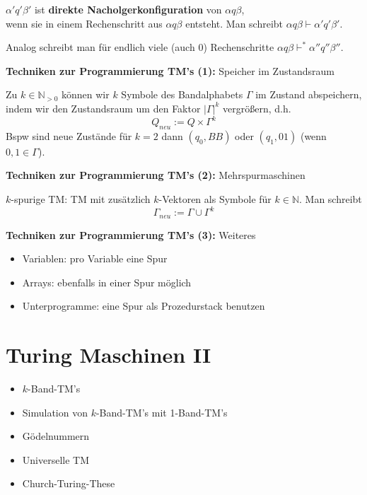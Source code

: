 \documentclass[a4paper,graphics,11pt]{article}
\begin{document}
$\alpha'q'\beta'$ ist \textbf{direkte Nacholgerkonfiguration} von $\alpha q \beta$,\\
wenn sie in einem Rechenschritt aus $\alpha q \beta$ entsteht. Man schreibt $\alpha q\beta \vdash \alpha'q'\beta'$.

Analog schreibt man für endlich viele (auch 0) Rechenschritte $\alpha q \beta \vdash^* \alpha''q''\beta''$.

\strut

\textbf{Techniken zur Programmierung TM's (1):} Speicher im Zustandsraum

Zu $k \in \mathbb{N}_{>0}$ können wir $k$ Symbole des Bandalphabets $\Gamma$ im Zustand abspeichern,\\
indem wir den Zustandsraum um den Faktor $|\Gamma|^k$ vergrößern, d.h.
$$
    Q_{neu} := Q \times \Gamma^k
$$
Bspw sind neue Zustände für $k = 2$ dann $(q_0, BB)$ oder $(q_1, 01)$ (wenn $0,1 \in \Gamma$).

\strut

\textbf{Techniken zur Programmierung TM's (2):} Mehrspurmaschinen

$k$-spurige TM: TM mit zusätzlich $k$-Vektoren als Symbole für $k \in \mathbb{N}$. Man schreibt
$$
    \Gamma_{neu} := \Gamma \cup \Gamma^k
$$

\strut

\textbf{Techniken zur Programmierung TM's (3):} Weiteres
\begin{itemize}
    \item Variablen: pro Variable eine Spur
    \item Arrays: ebenfalls in einer Spur möglich
    \item Unterprogramme: eine Spur als Prozedurstack benutzen
\end{itemize}

\newpage

\section{Turing Maschinen II}
\begin{itemize}
    \item $k$-Band-TM's
    \item Simulation von $k$-Band-TM's mit 1-Band-TM's
    \item Gödelnummern
    \item Universelle TM
    \item Church-Turing-These
\end{itemize}
\end{document}
